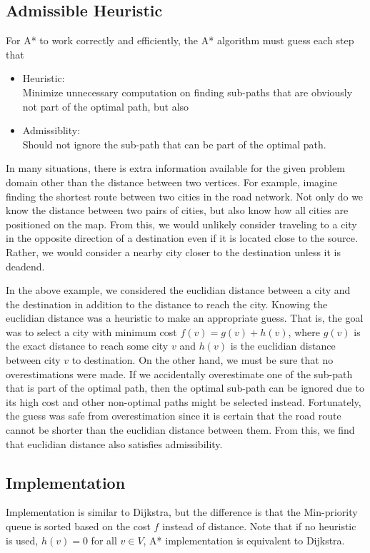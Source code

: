\documentclass{article}
\begin{document}
\subsection{Admissible Heuristic}
For A* to work correctly and efficiently, the A* algorithm must guess each step that
\begin{itemize}
    \item Heuristic: \\
    Minimize unnecessary computation on finding sub-paths that are obviously not part of the optimal path\cite{HNR}, but also 
    \item Admissiblity: \\
    Should not ignore the sub-path that can be part of the optimal path\cite{HNR}.  
\end{itemize}
In many situations, there is extra information available for the given problem domain other than the distance between two vertices. For example, imagine finding the shortest route between two cities in the road network. Not only do we know the distance between two pairs of cities, but also know how all cities are positioned on the map. From this, we would unlikely consider traveling to a city in the opposite direction of a destination even if it is located close to the source. Rather, we would consider a nearby city closer to the destination unless it is deadend. 

In the above example, we considered the euclidian distance between a city and the destination in addition to the distance to reach the city. Knowing the euclidian distance was a heuristic to make an appropriate guess. That is, the goal was to select a city with minimum cost $f(v) = g(v) + h(v)$, where $g(v)$ is the exact distance to reach some city $v$ and $h(v)$ is the euclidian distance between city $v$ to destination. On the other hand, we must be sure that no overestimations were made. If we accidentally overestimate one of the sub-path that is part of the optimal path, then the optimal sub-path can be ignored due to its high cost and other non-optimal paths might be selected instead. Fortunately, the guess was safe from overestimation since it is certain that the road route cannot be shorter than the euclidian distance between them\cite{HNR}. From this, we find that euclidian distance also satisfies admissibility.


\subsection{Implementation}
Implementation is similar to Dijkstra, but the difference is that the Min-priority queue is sorted based on the cost $f$ instead of distance. Note that if no heuristic is used, $h(v) = 0$ for all $v \in V$, A* implementation is equivalent to Dijkstra.
\end{document}
